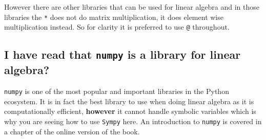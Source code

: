 However there are other libraries that can be used for linear algebra and in
those libraries the \texttt{*} does not do matrix multiplication, it does element wise
multiplication instead. So for clarity it is preferred to use \texttt{@} throughout.


\subsection{I have read that \texttt{numpy} is a library for linear algebra?}
\label{\detokenize{tools-for-mathematics/04-matrices/why/main:i-have-read-that-numpy-is-a-library-for-linear-algebra}}

\texttt{numpy} is one of the most popular and important libraries in the Python
ecosystem. It is in fact the best library to use when doing linear algebra as it
is computationally efficient, \textbf{however} it cannot handle symbolic variables
which is why you are seeing how to use \texttt{Sympy} here. An introduction to
\texttt{numpy} is covered in a chapter of the online version of the
book.
